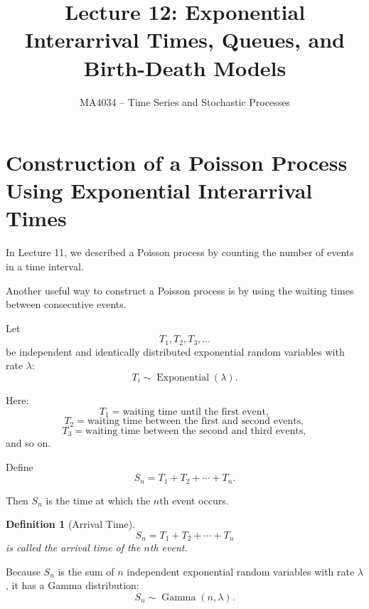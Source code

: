 \documentclass[12pt]{article}
\title{Lecture 12: Exponential Interarrival Times, Queues, and Birth-Death Models}
\author{MA4034 -- Time Series and Stochastic Processes}
\date{}
\newtheorem{definition}{Definition}
\begin{document}
\maketitle

\section{Construction of a Poisson Process Using Exponential Interarrival Times}

In Lecture 11, we described a Poisson process by counting the number of events in a time interval.

Another useful way to construct a Poisson process is by using the waiting times between consecutive events.

Let
\[
T_1,T_2,T_3,\ldots
\]
be independent and identically distributed exponential random variables with rate \(\lambda\):
\[
T_i\sim \operatorname{Exponential}(\lambda).
\]

Here:
\[
T_1=\text{waiting time until the first event},
\]
\[
T_2=\text{waiting time between the first and second events},
\]
\[
T_3=\text{waiting time between the second and third events},
\]
and so on.

\begin{center}
\end{center}

Define
\[
S_n=T_1+T_2+\cdots+T_n.
\]

Then \(S_n\) is the time at which the \(n\)th event occurs.

\begin{definition}[Arrival Time]
\[
S_n=T_1+T_2+\cdots+T_n
\]
is called the arrival time of the \(n\)th event.
\end{definition}

Because \(S_n\) is the sum of \(n\) independent exponential random variables with rate \(\lambda\), it has a Gamma distribution:
\[
S_n\sim \operatorname{Gamma}(n,\lambda).
\]
\end{document}
